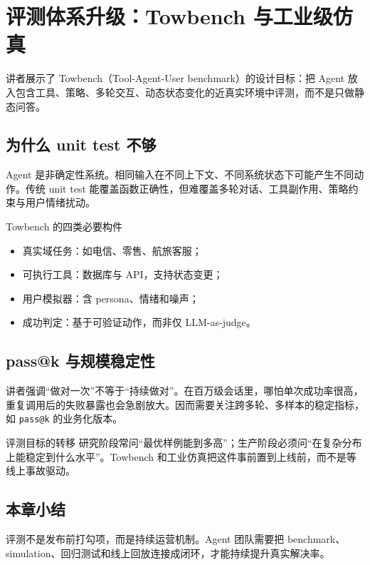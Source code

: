 \section{评测体系升级：Towbench 与工业级仿真}

讲者展示了 Towbench（Tool-Agent-User benchmark）的设计目标：把 Agent 放入包含工具、策略、多轮交互、动态状态变化的近真实环境中评测，而不是只做静态问答。

\subsection{为什么 unit test 不够}

Agent 是非确定性系统。相同输入在不同上下文、不同系统状态下可能产生不同动作。传统 unit test 能覆盖函数正确性，但难覆盖多轮对话、工具副作用、策略约束与用户情绪扰动。

\begin{knowledgebox}{Towbench 的四类必要构件}
\begin{itemize}[leftmargin=1.5em]
    \item 真实域任务：如电信、零售、航旅客服；
    \item 可执行工具：数据库与 API，支持状态变更；
    \item 用户模拟器：含 persona、情绪和噪声；
    \item 成功判定：基于可验证动作，而非仅 LLM-as-judge。
\end{itemize}
\end{knowledgebox}

\subsection{pass@k 与规模稳定性}

讲者强调“做对一次”不等于“持续做对”。在百万级会话里，哪怕单次成功率很高，重复调用后的失败暴露也会急剧放大。因而需要关注跨多轮、多样本的稳定指标，如 \texttt{pass@k} 的业务化版本。

\begin{importantbox}{评测目标的转移}
研究阶段常问“最优样例能到多高”；生产阶段必须问“在复杂分布上能稳定到什么水平”。Towbench 和工业仿真把这件事前置到上线前，而不是等线上事故驱动。
\end{importantbox}

\subsection{本章小结}

评测不是发布前打勾项，而是持续运营机制。Agent 团队需要把 benchmark、simulation、回归测试和线上回放连接成闭环，才能持续提升真实解决率。

